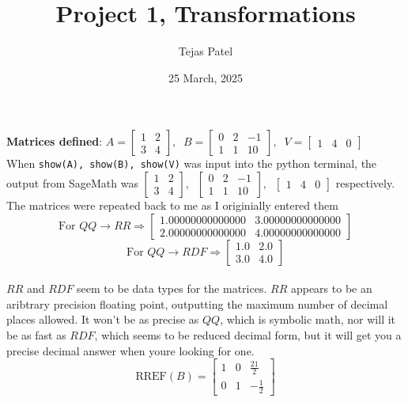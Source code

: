 \documentclass{article}
\title{Project 1, Transformations}
\date{25 March, 2025}
\author{Tejas Patel}
\begin{document}
\maketitle
\section{}
\textbf{Matrices defined}: $A=\begin{bmatrix}1&2\\3&4\end{bmatrix},\;\;B=\begin{bmatrix}0&2&-1\\1&1&10\end{bmatrix},\;\; V=\begin{bmatrix}1&4&0\end{bmatrix}$
\\[0.1in]When \verb+show(A), show(B), show(V)+ was input into the python terminal, the output from SageMath was $\begin{bmatrix}1&2\\3&4\end{bmatrix},\;\;\begin{bmatrix}0&2&-1\\1&1&10\end{bmatrix},\;\; \begin{bmatrix}1&4&0\end{bmatrix}$ respectively. The matrices were repeated back to me as I originially entered them
\\[0.01in]$$\text{For }QQ \rightarrow RR \Rightarrow \begin{bmatrix}1.00000000000000&3.00000000000000\\2.00000000000000&4.00000000000000\end{bmatrix}$$ 
$$\text{For }QQ \rightarrow RDF  \Rightarrow \begin{bmatrix}1.0 & 2.0 \\3.0 & 4.0\end{bmatrix}$$ 
\\[0.1in] $RR$ and $RDF$ seem to be data types for the matrices. $RR$ appears to be an aribtrary precision floating point, outputting the maximum number of decimal places allowed. It won't be as precise as $QQ$, which is symbolic math, nor will it be as fast as $RDF$, which seems to be reduced decimal form, but it will get you a precise decimal answer when youre looking for one.
\\[0.1in]$$\text{RREF}(B)=\begin{bmatrix}
    1 & 0 & \frac{21}{2} \\
0 & 1 & -\frac{1}{2}
\end{bmatrix}$$
\end{document}
